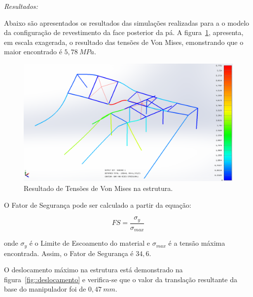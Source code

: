 \textit{Resultados:}

Abaixo são apresentados os resultados das simulações realizadas para a o modelo
da configuração de revestimento da face posterior da pá. 
A figura~\ref{fig::von_mises}, apresenta, em escala exagerada, o resultado das
tensões de Von Mises, emonstrando que o maior encontrado é $5,78~MPa$.

\begin{figure}[h!]
	\centering
	\includegraphics[width=0.9\columnwidth]{method/figs/dimensionamento/von_mises}
	\caption{Resultado de Tensões de Von Mises na estrutura.}
    \label{fig::von_mises}
\end{figure}

O Fator de Segurança pode ser calculado a partir da equação: 

\begin{equation*}
	FS=\frac{\sigma _y}{\sigma _{max}}
\end{equation*}

onde $\sigma_y$ é o Limite de Escoamento do material e $\sigma_{max}$ é a tensão
máxima encontrada. Assim, o Fator de Segurança é $34,6$.

O deslocamento máximo na estrutura está demonstrado na
figura~\ref{fig::deslocamento} e verifica-se que o valor da translação
resultante da base do manipulador foi de $0,47~mm$.

